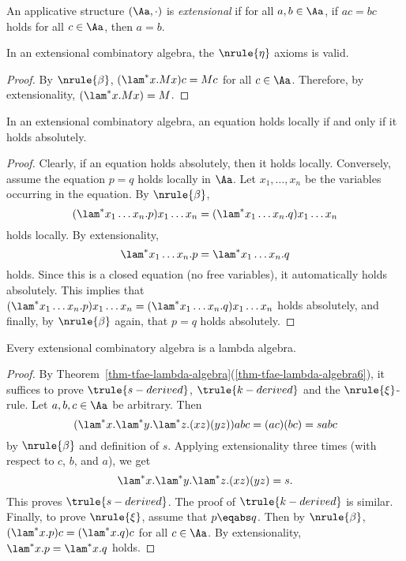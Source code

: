 \documentclass[12pt]{article}
\begin{document}
\begin{definition}
  An applicative structure $(\Aa,\cdot)$ is {\em extensional} if for all
  $a,b\in \Aa$, if $ac=bc$ holds for all $c\in \Aa$, then $a=b$.
\end{definition}

\begin{proposition}
  In an extensional combinatory algebra, the $\nrule{\eta}$ axioms is
  valid.
\end{proposition}

\begin{proof}
  By $\nrule{\beta}$, $(\lam^*x.Mx)c = Mc$ for all $c\in\Aa$. Therefore, by
  extensionality, $(\lam^*x.Mx)=M$.\eot
\end{proof}

\begin{proposition}
  In an extensional combinatory algebra, an equation holds locally if
  and only if it holds absolutely.
\end{proposition}

\begin{proof}
  Clearly, if an equation holds absolutely, then it holds locally.
  Conversely, assume the equation $p=q$ holds locally in $\Aa$. Let
  $x_1,\ldots,x_n$ be the variables occurring in the equation. By
  $\nrule{\beta}$, 
  \[(\lam^*x_1\ldots x_n.p)x_1\ldots
  x_n=(\lam^*x_1\ldots x_n.q)x_1\ldots x_n\] holds locally. By
  extensionality, \[\lam^*x_1\ldots x_n.p=\lam^*x_1\ldots x_n.q\]
  holds. Since this is a closed equation (no free variables), it
  automatically holds absolutely. This implies that $(\lam^*x_1\ldots
  x_n.p)x_1\ldots
  x_n=(\lam^*x_1\ldots x_n.q)x_1\ldots x_n$ holds absolutely, and
  finally, by $\nrule{\beta}$ again, that $p=q$ holds absolutely. \eot
\end{proof}

\begin{proposition}
  Every extensional combinatory algebra is a lambda
  algebra.
\end{proposition}

\begin{proof}
  By
  Theorem~\ref{thm-tfae-lambda-algebra}(\ref{thm-tfae-lambda-algebra6}),
  it suffices to prove $\trule{s-derived}$, $\trule{k-derived}$ and
  the $\nrule{\xi}$-rule. Let $a,b,c\in\Aa$ be arbitrary. Then 
  \[ (\lam^*x.\lam^*y.\lam^*z.(xz)(yz))abc = (ac)(bc) = sabc 
  \]
  by $\nrule{\beta}$ and definition of $s$. Applying extensionality three
  times (with respect to $c$, $b$, and $a$), we get
  \[ \lam^*x.\lam^*y.\lam^*z.(xz)(yz) = s.
  \]
  This proves $\trule{s-derived}$. The proof of $\trule{k-derived}$ is
  similar. Finally, to prove $\nrule{\xi}$, assume that $p\eqabs q$.
  Then by $\nrule{\beta}$, $(\lam^*x.p)c=(\lam^*x.q)c$ for all
  $c\in\Aa$. By extensionality, $\lam^*x.p=\lam^*x.q$ holds.\eot
\end{proof}
\end{document}
